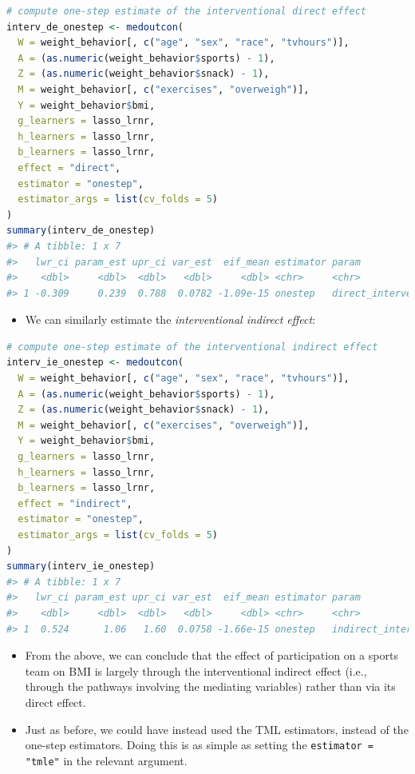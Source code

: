 \documentclass[
  12pt,
]{book}
\newcommand{\passthrough}[1]{#1}
\providecommand{\tightlist}{%
  \setlength{\itemsep}{0pt}\setlength{\parskip}{0pt}}
\theoremstyle{definition}
\theoremstyle{definition}
\theoremstyle{definition}
\newcommand{\1}{\mathbbm{1}}
\begin{document}
\begin{lstlisting}[language=R]
# compute one-step estimate of the interventional direct effect
interv_de_onestep <- medoutcon(
  W = weight_behavior[, c("age", "sex", "race", "tvhours")],
  A = (as.numeric(weight_behavior$sports) - 1),
  Z = (as.numeric(weight_behavior$snack) - 1),
  M = weight_behavior[, c("exercises", "overweigh")],
  Y = weight_behavior$bmi,
  g_learners = lasso_lrnr,
  h_learners = lasso_lrnr,
  b_learners = lasso_lrnr,
  effect = "direct",
  estimator = "onestep",
  estimator_args = list(cv_folds = 5)
)
summary(interv_de_onestep)
#> # A tibble: 1 x 7
#>   lwr_ci param_est upr_ci var_est  eif_mean estimator param                
#>    <dbl>     <dbl>  <dbl>   <dbl>     <dbl> <chr>     <chr>                
#> 1 -0.309     0.239  0.788  0.0782 -1.09e-15 onestep   direct_interventional
\end{lstlisting}

\begin{itemize}
\tightlist
\item
  We can similarly estimate the \emph{interventional indirect effect}:
\end{itemize}

\begin{lstlisting}[language=R]
# compute one-step estimate of the interventional indirect effect
interv_ie_onestep <- medoutcon(
  W = weight_behavior[, c("age", "sex", "race", "tvhours")],
  A = (as.numeric(weight_behavior$sports) - 1),
  Z = (as.numeric(weight_behavior$snack) - 1),
  M = weight_behavior[, c("exercises", "overweigh")],
  Y = weight_behavior$bmi,
  g_learners = lasso_lrnr,
  h_learners = lasso_lrnr,
  b_learners = lasso_lrnr,
  effect = "indirect",
  estimator = "onestep",
  estimator_args = list(cv_folds = 5)
)
summary(interv_ie_onestep)
#> # A tibble: 1 x 7
#>   lwr_ci param_est upr_ci var_est  eif_mean estimator param                  
#>    <dbl>     <dbl>  <dbl>   <dbl>     <dbl> <chr>     <chr>                  
#> 1  0.524      1.06   1.60  0.0758 -1.66e-15 onestep   indirect_interventional
\end{lstlisting}

\begin{itemize}
\tightlist
\item
  From the above, we can conclude that the effect of participation on a sports
  team on BMI is largely through the interventional indirect effect (i.e.,
  through the pathways involving the mediating variables) rather than via its
  direct effect.
\item
  Just as before, we could have instead used the TML estimators, instead of the
  one-step estimators. Doing this is as simple as setting the
  \passthrough{\lstinline!estimator = "tmle"!} in the relevant argument.
\end{itemize}
\end{document}
